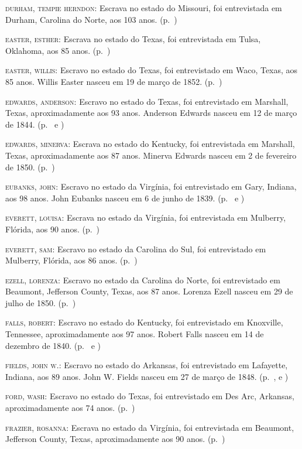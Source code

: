 \begin{Parskip}
\textsc{durham, tempie herndon:} Escrava no estado do Missouri, foi
entrevistada em Durham, Carolina do Norte, aos 103 anos. (p.~\pageref{ref77})

\textsc{easter, esther:} Escrava no estado do Texas, foi entrevistada em
Tulsa, Oklahoma, aos 85 anos. (p.~\pageref{ref78})

\textsc{easter, willis:} Escravo no estado do Texas, foi entrevistado em
Waco, Texas, aos 85 anos. Willis Easter nasceu em 19 de março de 1852. (p.~\pageref{ref79})

\textsc{edwards, anderson:} Escravo no estado do Texas, foi entrevistado
em Marshall, Texas, aproximadamente aos 93 anos. Anderson Edwards nasceu
em 12 de março de 1844. (p.~\pageref{ref80} e \pageref{ref81})

\textsc{edwards, minerva:} Escrava no estado do Kentucky, foi
entrevistada em Marshall, Texas, aproximadamente aos 87 anos. Minerva
Edwards nasceu em 2 de fevereiro de 1850. (p.~\pageref{ref82})

\textsc{eubanks, john:} Escravo no estado da Virgínia, foi entrevistado
em Gary, Indiana, aos 98 anos. John Eubanks nasceu em 6 de junho de
1839. (p.~\pageref{ref83} e \pageref{ref84})

\textsc{everett, louisa:} Escrava no estado da Virgínia, foi
entrevistada em Mulberry, Flórida, aos 90 anos. (p.~\pageref{ref85})

\textsc{everett, sam:} Escravo no estado da Carolina do Sul, foi
entrevistado em Mulberry, Flórida, aos 86 anos. (p.~\pageref{ref85})

\textsc{ezell, lorenza:} Escravo no estado da Carolina do Norte, foi
entrevistado em Beaumont, Jefferson County, Texas, aos 87 anos. Lorenza
Ezell nasceu em 29 de julho de 1850. (p.~\pageref{ref86})

\textsc{falls, robert:} Escravo no estado do Kentucky, foi entrevistado
em Knoxville, Tennessee, aproximadamente aos 97 anos. Robert Falls
nasceu em 14 de dezembro de 1840. (p.~\pageref{ref87} e \pageref{ref88})

\textsc{fields, john w.:} Escravo no estado do Arkansas, foi
entrevistado em Lafayette, Indiana, aos 89 anos. John W. Fields nasceu
em 27 de março de 1848. (p.~\pageref{ref89}, \pageref{ref90} e \pageref{ref91})

\textsc{ford, wash:} Escravo no estado do Texas, foi entrevistado em Des
Arc, Arkansas, aproximadamente aos 74 anos. (p.~\pageref{ref92})

\textsc{frazier, rosanna:} Escrava no estado da Virgínia, foi
entrevistada em Beaumont, Jefferson County, Texas, aproximadamente aos
90 anos. (p.~\pageref{ref93})


\end{Parskip}
